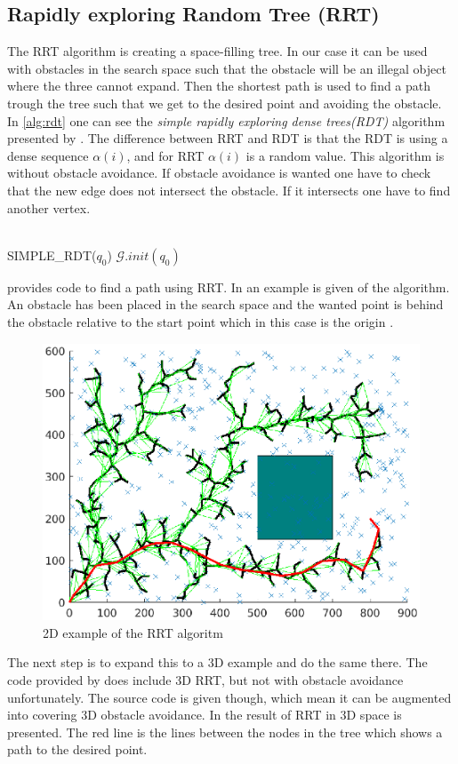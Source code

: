 \subsection{Rapidly exploring Random Tree (RRT)}
The RRT algorithm is creating a space-filling tree. In our case it can be used with obstacles in the search space such that the obstacle will be an illegal object where the three cannot expand. Then the shortest path is used to find a path trough the tree such that we get to the desired point and avoiding the obstacle. In \autoref{alg:rdt} one can see the \textit{simple rapidly exploring dense trees(RDT)} algorithm presented by \cite{Lavalle}. The difference between RRT and RDT is that the RDT is using a dense sequence $\alpha(i)$, and for RRT $\alpha(i)$ is a random value. This algorithm is without obstacle avoidance. If obstacle avoidance is wanted one have to check that the new edge does not intersect the obstacle. If it intersects one have to find another vertex.\\\\
\begin{algorithm}[htbp]
 SIMPLE\_RDT($q_0$)\;
 $\mathcal{G}.init(q_0)$\;
 \caption{}
 \label{alg:rdt}
\end{algorithm}
\cite{rrt} provides code to find a path using RRT. In  an example is given of the algorithm. An obstacle has been placed in the search space and the wanted point is behind the obstacle relative to the start point which in this case is the origin \cite{rrt}.
\begin{figure}[htbp]
  \centering
  \includegraphics[width=.9\textwidth]{img/rrt2dex.eps}
  \caption{2D example of the RRT algoritm}
  \label{fig:rrt2dex}
\end{figure}
The next step is to expand this to a 3D example and do the same there. The code provided by \cite{rrt} does include 3D RRT, but not with obstacle avoidance unfortunately. The source code is given though, which mean it can be augmented into covering 3D obstacle avoidance. In  the result of RRT in 3D space is presented. The red line is the lines between the nodes in the tree which shows a path to the desired point. 

